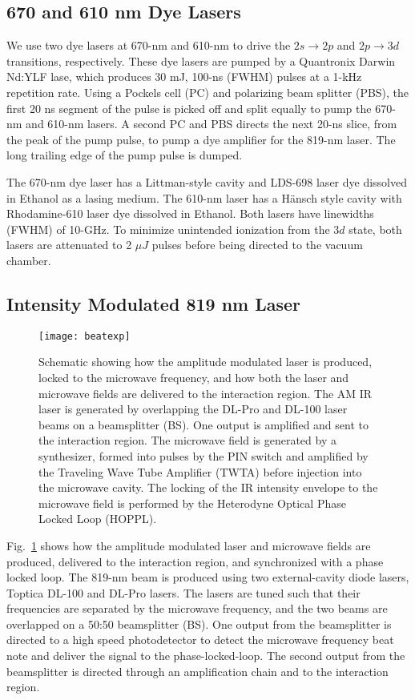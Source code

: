 \documentclass[aps,pra,preprint,groupedaddress]{revtex4-1}
\begin{document}
\subsection{\label{sec:dye} 670 and 610 nm Dye Lasers}

We use two dye lasers at 670-nm and 610-nm to drive the $2s \rightarrow 2p$ and $2p \rightarrow 3d$ transitions, respectively. These dye lasers are pumped by a Quantronix Darwin Nd:YLF lase, which produces 30 mJ, 100-ns (FWHM) pulses at a 1-kHz repetition rate. Using a Pockels cell (PC) and polarizing beam splitter (PBS), the first 20 ns segment of the pulse is picked off and split equally to pump the 670-nm and 610-nm lasers. A second PC and PBS directs the next 20-ns slice, from the peak of the pump pulse, to pump a dye amplifier for the 819-nm laser. The long trailing edge of the pump pulse is dumped.

The 670-nm dye laser has a Littman-style cavity and LDS-698 laser dye dissolved in Ethanol as a lasing medium. The 610-nm laser has a H{\"a}nsch style cavity with Rhodamine-610 laser dye dissolved in Ethanol. Both lasers have linewidths (FWHM) of 10-GHz. To minimize unintended ionization from the $3d$ state, both lasers are attenuated to 2 $\mu J$ pulses before being directed to the vacuum chamber.

\subsection{\label{sec:ampmod} Intensity Modulated 819 nm Laser}

\begin{figure}
	\texttt{[image: beatexp]}
	\caption{Schematic showing how the amplitude modulated laser is produced, locked to the microwave frequency, and how both the laser and microwave fields are delivered to the interaction region. The AM IR laser is generated by overlapping the DL-Pro and DL-100 laser beams on a beamsplitter (BS). One output is amplified and sent to the interaction region. The microwave field is generated by a synthesizer, formed into pulses by the PIN switch and amplified by the Traveling Wave Tube Amplifier (TWTA) before injection into the microwave cavity. The locking of the IR intensity envelope to the microwave field is performed by the Heterodyne Optical Phase Locked Loop (HOPPL).}
	\label{fig:pll}
\end{figure}

Fig.~\ref{fig:pll} shows how the amplitude modulated laser and microwave fields are produced, delivered to the interaction region, and synchronized with a phase locked loop. The 819-nm beam is produced using two external-cavity diode lasers, Toptica DL-100 and DL-Pro lasers. The lasers are tuned such that their frequencies are separated by the microwave frequency, and the two beams are overlapped on a 50:50 beamsplitter (BS). One output from the beamsplitter is directed to a high speed photodetector to detect the microwave frequency beat note and deliver the signal to the phase-locked-loop. The second output from the beamsplitter is directed through an amplification chain and to the interaction region.
\end{document}
